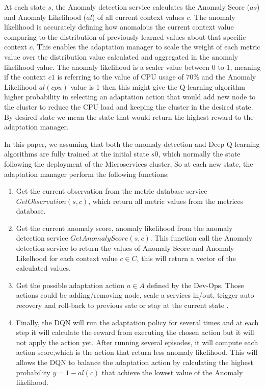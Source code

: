 \documentclass{ieeeaccess}
\begin{document}
At each state $s$, the Anomaly detection service calculates the Anomaly Score ($as$) and Anomaly Likelihood ($al$) of all current context values $c$. The anomaly likelihood is accurately defining how anomalous the current context value comparing to the distribution of previously learned values about that specific context $c$. This enables the adaptation manager to scale the weight of each metric value over the distribution value calculated and aggregated in the anomaly likelihood value. The anomaly likelihood is a scaler value between 0 to 1, meaning if the context  $c1$ is referring to  the value of CPU usage of 70\% and the Anomaly Likelihood $al(cpu)$ value is 1 then this might give the Q-learning algorithm higher probability in selecting an adaptation action that would add new node to the cluster to reduce the CPU load and keeping the cluster in the desired state. By desired state we mean the state that would return the highest reward to the adaptation manager. 

 
 

In this paper, we assuming that both the anomaly detection  and Deep Q-learning algorithms are fully trained at the initial state $s0$, which normally the state following the deployment of the Microservices cluster, So at each new state, the adaptation manager perform the following functions: 
 \begin{enumerate}
 
 
 \item Get the current observation from the metric database service $GetObservation(s,c)$, which return all metric values from the metrices database.
 \item Get the current anomaly score, anomaly likelihood from the anomaly detection service $GetAnomalyScore(s,c)$. This function call the Anomaly detection service to return the values of Anomaly Score and Anomaly Likelhood for each context value $c \in C$, this will return a vector of the calculated values.
	
 \item Get the possible adaptation  action $a \in A$ defined by the Dev-Ops. Those actions could be adding/removing node, scale a services in/out, trigger auto recovery and roll-back to previous sate  or stay at the current state .  
 \item Finally, the DQN will run the adaptation policy for several times and at each step it will calculate the reward from executing the chosen action but it will not apply the action yet. After running several episodes, it will compute each action score,which is the action that return less anomaly likelihood. This will allows the DQN to balance the adaptation action by calculating the highest probability $y = 1 - al(c)$ that achieve the lowest value of the Anomaly likelihood. 
 \end{enumerate}
\end{document}
